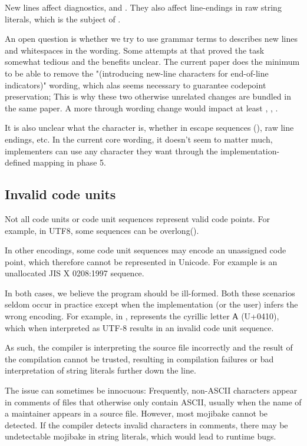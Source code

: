 \documentclass{wg21}
\begin{document}
New lines affect diagnostics,  and .
They also affect line-endings in raw string literals, which is the subject of .


An open question is whether we try to use grammar terms to describes new lines and whitespaces in the wording.
Some attempts at that proved the task somewhat tedious and the benefits unclear.
The current paper does the minimum to be able to remove the "(introducing new-line characters for end-of-line indicators)" wording,
which alas seems necessary to guarantee codepoint preservation; This is why these two otherwise unrelated changes are bundled in the same paper.
A more through wording change would impact at least \tcode{[lex]}, \tcode{[cpp]}, .

It is also unclear what the  character is, whether in escape sequences (), raw line endings, etc.
In the current core wording, it doesn't seem to matter much, implementers can use any character they want through the implementation-defined
mapping in phase 5.

\subsection{Invalid code units}

Not all code units or code unit sequences represent valid code points.
For example, in UTF8, some sequences can be overlong().

In other encodings, some code unit sequences may encode an unassigned code point, which therefore cannot be represented in Unicode.
For example  is an unallocated JIS X 0208:1997 sequence.

In both cases, we believe the program should be ill-formed.
Both these scenarios seldom occur in practice except when the implementation (or the user) infers the wrong encoding.
For example, in ,  represents the cyrillic letter А (U+0410), which when interpreted
as UTF-8 results in an invalid code unit sequence.

As such, the compiler is interpreting the source file incorrectly and the result of the compilation cannot be trusted,
resulting in compilation failures or bad interpretation of string literals further down the line.

The issue can sometimes be innocuous:
Frequently, non-ASCII characters appear in comments of files that otherwise only contain ASCII, usually when the name of
a maintainer appears in a source file.
However, most mojibake cannot be detected. If the compiler detects invalid characters in comments, there may be undetectable
mojibake in string literals, which would lead to runtime bugs.
\end{document}
